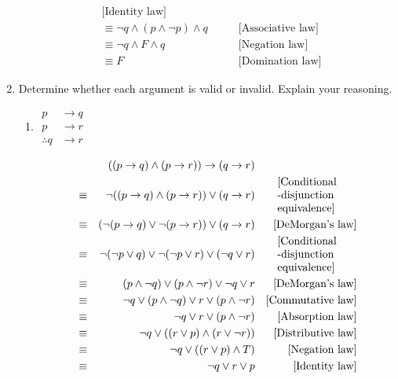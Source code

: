 \documentclass[letterpaper, 12pt]{article}
\newcommand{\then}{\rightarrow}
\begin{document}
\begin{enumerate}
\begin{align*}
    &\text{[Identity law]} \\
    &\equiv \neg q \wedge (p \wedge \neg p) \wedge q \qquad
    &\text{[Associative law]} \\
    &\equiv \neg q \wedge F \wedge q \qquad
    &\text{[Negation law]} \\
    &\equiv F \qquad
    &\text{[Domination law]}
\end{align*}
\pagebreak
\item Determine whether each argument is valid or invalid. Explain your reasoning.
\begin{enumerate}
\item \parbox{3in}{$\begin{aligned}
    p &\then q \\
    p &\then r \\
    \hline
    \therefore q &\then r
\end{aligned}$}
\begin{align*}
    &\quad & ((p \then q) \wedge (p \then r)) \then (q \then r) \\
    &\equiv & \neg((p \then q) \wedge (p \then r)) \vee (q \then r) & 
    &\parbox{1in}{[Conditional \\-disjunction \\ equivalence]} \\
    &\equiv & (\neg(p \then q) \vee \neg(p \then r)) \vee (q \then r) & 
    &\text{[DeMorgan's law]} \\
    &\equiv & \neg(\neg p \vee q) \vee \neg(\neg p \vee r) \vee (\neg q \vee r) & 
    &\parbox{1in}{[Conditional \\-disjunction \\ equivalence]} \\
    &\equiv & (p \wedge \neg q) \vee (p \wedge \neg r) \vee \neg q \vee r & 
    &\text{[DeMorgan's law]} \\
    &\equiv & \neg q \vee (p \wedge \neg q) \vee r \vee (p \wedge \neg r) & 
    &\text{[Commutative law]} \\
    &\equiv & \neg q \vee r \vee (p \wedge \neg r) & 
    &\text{[Absorption law]} \\
    &\equiv & \neg q \vee ((r \vee p) \wedge (r \vee \neg r)) & 
    &\text{[Distributive law]} \\
    &\equiv & \neg q \vee ((r \vee p) \wedge T) & 
    &\text{[Negation law]} \\
    &\equiv & \neg q \vee r \vee p & 
    &\text{[Identity law]}
\end{align*}
\begin{flushleft}

\end{flushleft}
\end{enumerate}
\end{enumerate}
\end{document}

